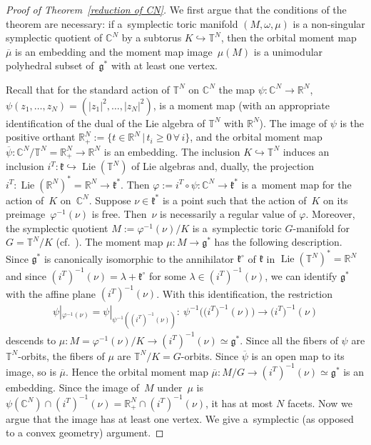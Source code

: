 \documentclass[10pt,a4paper]{amsart}
\numberwithin{equation}{section}
\begin{document}
\begin{proof}[Proof of Theorem~\ref{reduction of CN}]
  We f\/irst argue that the conditions of the theorem are necessary: if
  a~symplectic toric manifold $(M,\omega, \mu)$ is a non-singular
  symplectic quotient of ${\mathbb C}^N$ by a subtorus $K\hookrightarrow {\mathbb T}^N$,
  then the orbital moment map $\overline{\mu}$ is an embedding and the
  moment map image~$\mu(M)$ is a unimodular polyhedral subset of~${\mathfrak g}^*$ with at least one vertex.

  Recall that for the standard action of ${\mathbb T}^N$ on ${\mathbb C}^N$ the map
  $\psi \colon {\mathbb C}^N \to {\mathbb R}^N$,   $\psi(z_1, \ldots, z_N) = (|z_1|^2,
  \ldots, |z_N|^2)$, is a moment map (with an appropriate
  identif\/ication of the dual of the Lie algebra of ${\mathbb T}^N$ with
  ${\mathbb R}^N$).
  The image of $\psi$ is the positive orthant ${\mathbb R}^N_+ :=
  \{t\in {\mathbb R}^N\,|\, t_i\geq 0 \, \forall\, i\}$,
  and the orbital moment map
  $\overline{\psi} \colon {\mathbb C}^N/{\mathbb T}^N = {\mathbb R}^N_+\to {\mathbb R}^N$ is an embedding.
  The inclusion $K\hookrightarrow {\mathbb T}^N$ induces an
  inclusion $i^T \colon {\mathfrak k}\hookrightarrow \operatorname{Lie}({\mathbb T}^N)$ of Lie algebras
  and, dually, the projection $i^T \colon \operatorname{Lie}({\mathbb R}^N)^*= {\mathbb R}^N\to
  {\mathfrak k}^*$.  Then $\varphi:=i^T\circ \psi \colon {\mathbb C}^N\to {\mathfrak k}^*$ is a~moment map for the action of~$K$ on~${\mathbb C}^N$.  Suppose $\nu\in {\mathfrak k}^*$
  is a point such that the action of~$K$ on its preimage~$\varphi^{-1}
  (\nu)$ is free. Then~$\nu$ is necessarily a regular value of
  $\varphi$. Moreover, the symplectic quotient $M:= \varphi ^{-1}
  (\nu)/K$ is a~symplectic toric $G$-manifold for $G= {\mathbb T}^N/K$ (cf.~\cite{De}).  The moment map $\mu \colon M\to {\mathfrak g}^*$ has the
  following description.  Since ${\mathfrak g}^*$ is canonically isomorphic to
  the annihilator ${\mathfrak k}^\circ$ of ${\mathfrak k}$ in $\operatorname{Lie}({\mathbb T}^N)^* ={\mathbb R}^N$ and
  since $(i^T)^{-1} (\nu) = \lambda + {\mathfrak k}^\circ$ for some $\lambda \in
  (i^T)^{-1} (\nu)$, we can identify ${\mathfrak g}^*$ with the af\/f\/ine plane
  $(i^T)^{-1} (\nu)$.  With this identif\/ication, the restriction
\begin{gather*}
\psi|_{\varphi^{-1} (\nu)} = \psi|_{\psi^{-1} ((i^T)^{-1} (\nu))} \colon
\  \psi^{-1} \big(\big(i^T\big)^{-1} (\nu)\big)   \to   \big(i^T\big)^{-1} (\nu)
\end{gather*}
descends to $\mu \colon M=\varphi^{-1} (\nu)/K \to (i^T)^{-1} (\nu)\simeq
{\mathfrak g}^*$.  Since all the f\/ibers of $\psi$ are ${\mathbb T}^N$-orbits, the f\/ibers
of $\mu$ are ${\mathbb T}^N/K= G$-orbits.  Since $\overline{\psi}$ is an open map
to its image, so is $\overline{\mu}$.
Hence the orbital moment map
$\overline{\mu} \colon M/G\to (i^T)^{-1} (\nu) \simeq {\mathfrak g}^*$ is an embedding.
Since the image of~$M$ under~$\mu$ is $\psi({\mathbb C}^N) \cap (i^T)^{-1} (\nu)
= {\mathbb R}^N_+ \cap (i^T)^{-1} (\nu)$, it has at most $N$ facets.  Now we
argue that the image has at least one vertex.  We give a~symplectic (as opposed to a convex geometry) argument.


\end{proof}
\end{document}
